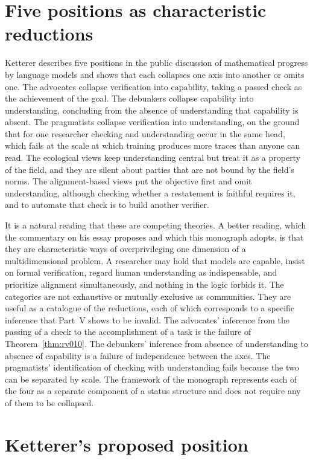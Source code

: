 \section{Five positions as characteristic reductions}

Ketterer describes five positions in the public discussion of mathematical progress by language models and shows that each collapses one axis into another or omits one. The advocates collapse verification into capability, taking a passed check as the achievement of the goal. The debunkers collapse capability into understanding, concluding from the absence of understanding that capability is absent. The pragmatists collapse verification into understanding, on the ground that for one researcher checking and understanding occur in the same head, which fails at the scale at which training produces more traces than anyone can read. The ecological views keep understanding central but treat it as a property of the field, and they are silent about parties that are not bound by the field's norms. The alignment-based views put the objective first and omit understanding, although checking whether a restatement is faithful requires it, and to automate that check is to build another verifier.

It is a natural reading that these are competing theories. A better reading, which the commentary on his essay proposes and which this monograph adopts, is that they are characteristic ways of overprivileging one dimension of a multidimensional problem. A researcher may hold that models are capable, insist on formal verification, regard human understanding as indispensable, and prioritize alignment simultaneously, and nothing in the logic forbids it. The categories are not exhaustive or mutually exclusive as communities. They are useful as a catalogue of the reductions, each of which corresponds to a specific inference that Part~V shows to be invalid. The advocates' inference from the passing of a check to the accomplishment of a task is the failure of Theorem~\ref{thm:rv010}. The debunkers' inference from absence of understanding to absence of capability is a failure of independence between the axes. The pragmatists' identification of checking with understanding fails because the two can be separated by scale. The framework of the monograph represents each of the four as a separate component of a status structure and does not require any of them to be collapsed.

\section{Ketterer's proposed position}


